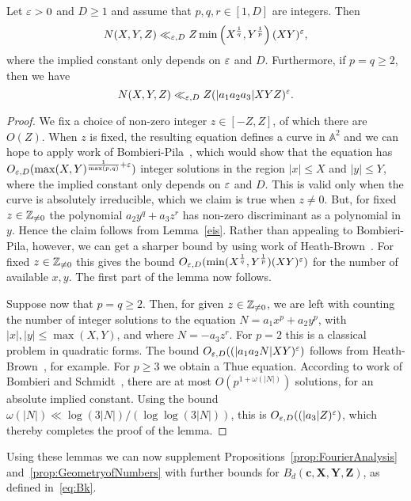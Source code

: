 \begin{lemma}\label{lem:t15}
Let $\varepsilon>0$ and $D\geq 1$ and
assume that $p,q,r\in [1,D]$ are integers. Then
\[
N(X,Y,Z)\ll_{\varepsilon,D} Z \min\left(X^{\frac{1}{q}}, Y^{\frac{1}{p}} \right) (XY)^\varepsilon,
\]
where the implied constant only depends on $\varepsilon$ and $D$. Furthermore,
if $p=q\geq 2$,
then we have
\[
N(X,Y,Z)\ll_{\varepsilon,D} Z (|a_1a_2a_3|XYZ)^\varepsilon.
\]
\end{lemma}


\begin{proof}
We fix a choice of non-zero integer $z\in [-Z,Z]$, of which there are $O(Z)$. When $z$ is fixed, the resulting equation defines a curve in $\mathbb{A}^2$ and we can hope to apply work of Bombieri-Pila~\cite[Theorem~4]{bp}, which would show that the equation has $O_{\varepsilon,D}(\max(X,Y)^{\frac{1}{\max(p,q)}+\varepsilon})$ integer solutions in the region $|x|\leq X$ and $|y|\leq Y$, where the implied constant only depends on $\varepsilon$ and $D$. This is valid only when
the curve is absolutely irreducible, which we claim is true when $z\neq 0$. But, for fixed $z\in \mathbb{Z}_{\neq 0}$ the
polynomial $a_2y^q+a_3z^r$ has non-zero discriminant as a polynomial in $y$. Hence the claim follows from Lemma~\ref{eis}. Rather than appealing to Bombieri-Pila, however, we can get a sharper bound by using work of
 Heath-Brown~\cite[Theorem 15]{cime}. For fixed $z\in \mathbb{Z}_{\neq 0}$ this gives the bound
 $O_{\varepsilon,D}(\min(X^{\frac{1}{q}},Y^{\frac{1}{p}})(XY)^\varepsilon)$ for the number of available $x,y$.
 The first part of the lemma now follows.

 Suppose now that $p=q\geq 2$. Then, for given $z\in \mathbb{Z}_{\neq 0}$, we are left with counting the number of integer solutions to the equation $N=a_1x^p+a_2y^p$, with $|x|,|y|\leq \max(X,Y)$, and
 where $N=-a_3z^r$. For $p=2$ this is a classical problem in quadratic forms. The
bound $O_{\varepsilon,D}((|a_1a_2N|XY)^\varepsilon)$ follows from Heath-Brown~\cite[Theorem~3]{cubic}, for example.
 For $p\geq 3$ we obtain a Thue equation. According to work of Bombieri and Schmidt~\cite{bs}, there are at most $O(p^{1+\omega(|N|)})$ solutions, for an absolute implied constant. Using the bound $\omega(|N|)\ll \log(3|N|)/(\log \log(3|N|))$, this is $O_{\varepsilon,D}((|a_3|Z)^\varepsilon)$, which thereby completes the proof of the lemma.
 \end{proof}


Using these lemmas we can now supplement Propositions~\ref{prop:FourierAnalysis}
and~\ref{prop:GeometryofNumbers} with further bounds
for $B_d(\mathbf{c},\mathbf{X},\mathbf{Y},\mathbf{Z})$, as defined in~\eqref{eq:Bk}.


